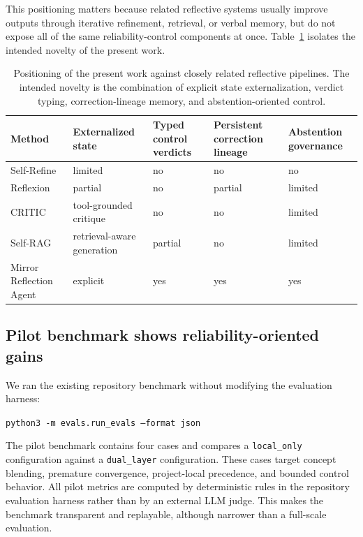 \documentclass[12pt]{article}
\begin{document}
This positioning matters because related reflective systems usually improve outputs through iterative refinement, retrieval, or verbal memory, but do not expose all of the same reliability-control components at once. Table~\ref{tab:positioning-v3} isolates the intended novelty of the present work.

\begin{table}[H]
\centering
\begin{tabular}{p{3.0cm}p{2.2cm}p{2.2cm}p{2.6cm}p{2.0cm}}
\toprule
Method & Externalized state & Typed control verdicts & Persistent correction lineage & Abstention governance \\
\midrule
Self-Refine & limited & no & no & no \\
Reflexion & partial & no & partial & limited \\
CRITIC & tool-grounded critique & no & no & limited \\
Self-RAG & retrieval-aware generation & partial & no & limited \\
Mirror Reflection Agent & explicit & yes & yes & yes \\
\bottomrule
\end{tabular}
\caption{Positioning of the present work against closely related reflective pipelines. The intended novelty is the combination of explicit state externalization, verdict typing, correction-lineage memory, and abstention-oriented control.}
\label{tab:positioning-v3}
\end{table}

\subsection{Pilot benchmark shows reliability-oriented gains}

We ran the existing repository benchmark without modifying the evaluation harness:

\begin{center}
\texttt{python3 -m evals.run\_evals --format json}
\end{center}

The pilot benchmark contains four cases and compares a \texttt{local\_only} configuration against a \texttt{dual\_layer} configuration. These cases target concept blending, premature convergence, project-local precedence, and bounded control behavior. All pilot metrics are computed by deterministic rules in the repository evaluation harness rather than by an external LLM judge. This makes the benchmark transparent and replayable, although narrower than a full-scale evaluation.
\end{document}
